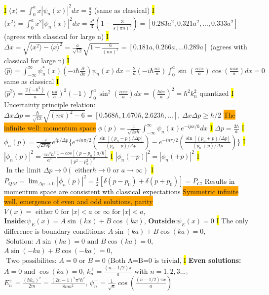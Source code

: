 \documentclass[fontsize=4pt]{scrartcl}
\begin{document}
\hl{I}
$\langle x \rangle  = \int_{0}^{a} x |\psi_n (x)|^2 dx = \frac{a}{2}$ (same as classical)
\hl{I}
$\langle x^2 \rangle  = \int_{0}^{a} x^2|\psi_n (x)|^2 dx = \frac{a^3}{3}(1-\frac{3}{s(\pi n)^2}) = [0.283a^2, 0.321a^2, ... , 0.333a^2]$ (agrees with classical for large n)
\hl{I}
$\Delta x = \sqrt{\langle x^2 \rangle - \langle x \rangle^2} = \frac{a}{\sqrt{12}}\sqrt{1-\frac{6}{(n\pi)^2}} = [0.181a, 0.266a, ... 0.289a]$ (agrees with classical for large n)
\hl{I}
$\langle \hat{p} \rangle = \int_{-\infty}^{\infty} \psi_n^{*}(x)(-i\hbar\frac{\partial}{\partial x})\psi_n (x) dx = \frac{2}{a}(-i \hbar \frac{n\pi}{a} ) \int_0^a \sin(\frac{n\pi x }{a})\cos(\frac{n\pi x}{a}) dx = 0$ same as classical
\hl{I}
$\langle \hat{p}^2 \rangle = \frac{2 (-\hbar^2)}{a}(\frac{n\pi}{a})^2(-1) \int_0^a \sin^2(\frac{n\pi x }{a}) dx =(\frac{\hbar b \pi}{a})^2 = \hbar^2 k_n^2$  quantized
\hl{I}
Uncertainty principle relation: $\Delta x \Delta p = \frac{\hbar}{\sqrt{12}}\sqrt{(n\pi)^2 - 6} = [0.568 \hbar, 1.670 \hbar, 2.623 \hbar, ...]$, $\Delta x \Delta p \geq \hbar/2$ 
\colorbox{Orange}{The infinite well: momentum space}
$\phi(p) = \frac{1}{\sqrt{2\pi \hbar}}\int_{-\infty}^{\infty} \psi_n (x) e^{-ipx/ \hbar} dx$
\hl{I}
$\Delta p = \frac{2 \hbar}{a}$
\hl{I}
$\phi_n(p) = \frac{-i}{\sqrt{2 \pi \delta p}}e^{ip / \Delta p}\{e^{+in\pi/2}(\frac{\sin[(p_n - p)/\Delta p]}{(p_n - p)/\Delta p}) - e^{-i n \pi / 2}(\frac{\sin[(p_n + p)/\Delta p]}{(p_n + p)/\Delta p})\}$
\hl{I}
$|\phi_n(p)|^2 = \frac{\pi n^2 \hbar^3}{a^3}\frac{1-cos[(p-p_n)a/\hbar]}{(p^2 - p_n^2)^2}$
\hl{I}
$|\phi_n(-p)|^2 = |\phi_n(+p)|^2$
\hl{I}
$ \text{ In the limit  }\Delta p \rightarrow 0 ( \text{ either}  \hbar \rightarrow 0 \text{ or } a \rightarrow \infty)$ 
\hl{I} 
$P_{QM} = \lim_{\Delta p \rightarrow 0}|\phi_n(p)|^2 = \frac{1}{2}[\delta(p-p_0)+\delta(p+p_0)] = P_{Cl}$
Results in momentum space are consistent wth classical expectations
\colorbox{Orange}{Symmetric infinite well, emergence of even and odd solutions, parity}
$V(x) = \text{ either } 0 \text{ for } |x|<a \text { or } \infty \text { for } |x| < a$,
$\textbf{Inside:} \psi_E(x) = A\sin(kx) + B\cos(kx)$,
$\textbf{Outside:} \psi_E(x) = 0$
\hl{I}
The only difference is boundary conditions:
$A\sin(ka) + B\cos(ka) = 0$, $\text{ Solution: } A\sin(ka) = 0 \text{ and } B\cos(ka) = 0$,
$A\sin(-ka) + B\cos(-ka) = 0$, $\text{ Two possibilites: } A = 0 \text{ or } B = 0 \text{ (Both A=B=0 is trivial}$,
\hl{I}
\textbf{Even solutions:} $A = 0 \text{ and } \cos(ka) = 0$,
$k_{n}^{+} = \frac{(n-1/2)\pi}{a} \text { with } n = 1,2,3...$, $E_n^{+}  = \frac{(\hbar k_n)^2}{2m} = \frac{(2n-1)^2 \pi^2 \hbar^2}{8ma^2}$, $\psi_n^{+} = \frac{1}{\sqrt{a}}\cos (\frac{(n-1/2)\pi x}{a})$
\end{document}
